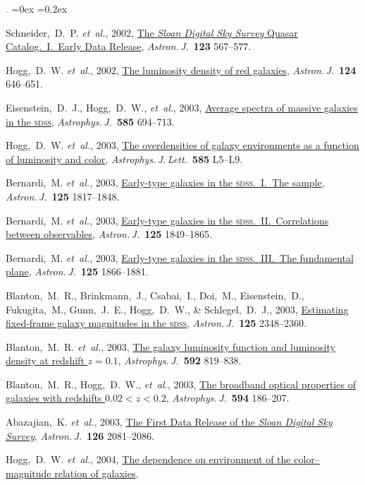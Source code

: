 \documentclass[12pt,letterpaper]{article}
\newcommand{\latin}[1]{\textsl{#1}}
\newcommand{\etal}{\latin{et~al.}}
\newcommand{\project}[1]{\textsl{#1}}
\newcommand{\doi}[2]{\href{http://dx.doi.org/#1}{{#2}}}
\newcommand{\deemph}[1]{\textcolor{grey}{\footnotesize{#1}}}
\newcommand{\pubnumber}[1]{\deemph{{#1}.}}
\newcounter{refpubnum}
\newcommand{\hogglist}{%
    \rightmargin=0in
    \leftmargin=0.18in
    \topsep=0ex
    \partopsep=0pt
    \itemsep=0.2ex
    \parsep=0pt
    \itemindent=-1.0\leftmargin
    \listparindent=0.0\leftmargin
    \settowidth{\labelsep}{~}
    \usecounter{refpubnum}
  }
\begin{document}
\begin{list}{\pubnumber{\therefpubnum}}{\hogglist}
\item
Schneider,~D.~P. \etal, 2002,
\doi{10.1086/338434}{The \project{Sloan Digital Sky Survey} Quasar Catalog.\ I.\ Early Data Release},
\textit{Astron.\,J.}\ \textbf{123} 567--577.
\item
Hogg,~D.~W. \etal, 2002,
\doi{10.1086/341392}{The luminosity density of red galaxies},
\textit{Astron.\,J.}\ \textbf{124} 646--651.
\item
Eisenstein,~D.~J., Hogg,~D.~W., \etal, 2003,
\doi{10.1086/346233}{Average spectra of massive galaxies in the \textsc{sdss}},
\textit{Astrophys.\,J.}\ \textbf{585} 694--713.
\item
Hogg,~D.~W. \etal, 2003,
\doi{10.1086/374238}{The overdensities of galaxy environments as a function of luminosity and color},
\textit{Astrophys.\,J.\,Lett.}\
\textbf{585} L5--L9.
\item
Bernardi,~M. \etal, 2003,
\doi{10.1086/367776}{Early-type galaxies in the \textsc{sdss}.\ I.\ The sample},
\textit{Astron.\,J.}\ \textbf{125} 1817--1848.
\item
Bernardi,~M. \etal, 2003,
\doi{10.1086/374256}{Early-type galaxies in the \textsc{sdss}.\ II.\ Correlations between observables},
\textit{Astron.\,J.}\ \textbf{125} 1849--1865.
\item
Bernardi,~M. \etal, 2003,
\doi{10.1086/367794}{Early-type galaxies in the \textsc{sdss}.\ III.\ The fundamental plane},
\textit{Astron.\,J.}\ \textbf{125} 1866--1881.
\item
Blanton,~M.~R., Brinkmann,~J., Csabai,~I., Doi,~M., Eisenstein,~D., Fukugita,~M., Gunn,~J.~E., Hogg,~D.~W., \& Schlegel,~D.~J., 2003,
\doi{10.1086/342935}{Estimating fixed-frame galaxy magnitudes in the \textsc{sdss}},
\textit{Astron.\,J.}\ \textbf{125} 2348--2360.
\item
Blanton,~M.~R. \etal, 2003,
\doi{10.1086/375776}{The galaxy luminosity function and luminosity density at redshift $z=0.1$},
\textit{Astrophys.\,J.}\ \textbf{592} 819--838.
\item
Blanton,~M.~R., Hogg,~D.~W., \etal, 2003,
\doi{10.1086/375528}{The broadband optical properties of galaxies with redshifts $0.02<z<0.2$},
\textit{Astrophys.\,J.}\ \textbf{594} 186--207.
\item
Abazajian,~K. \etal, 2003,
\doi{10.1086/378165}{The First Data Release of the \project{Sloan Digital Sky Survey}},
\textit{Astron.\,J.}\ \textbf{126} 2081--2086.
\item\label{pub:Hogg2004}
Hogg,~D.~W. \etal, 2004,
\doi{10.1086/381749}{The dependence on environment of the color--magnitude relation of galaxies},

\end{list}
\end{document}
